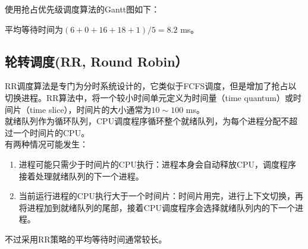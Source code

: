使用抢占优先级调度算法的Gantt图如下：

\begin{figure}[H]
    \centering
\end{figure}

平均等待时间为$ (6 + 0 + 16 + 18 + 1) / 5 = 8.2 $ ms。\\

\subsection{轮转调度(RR, Round Robin）}

RR调度算法是专门为分时系统设计的，它类似于FCFS调度，但是增加了抢占以切换进程。RR算法中，将一个较小时间单元定义为时间量（time quantum）或时间片（time slice），时间片的大小通常为$ 10 \sim 100 $ ms。\\

就绪队列作为循环队列，CPU调度程序循环整个就绪队列，为每个进程分配不超过一个时间片的CPU。\\

有两种情况可能发生：

\begin{enumerate}
    \item 进程可能只需少于时间片的CPU执行：进程本身会自动释放CPU，调度程序接着处理就绪队列的下一个进程。

    \item 当前运行进程的CPU执行大于一个时间片：时间片用完，进行上下文切换，再将进程加到就绪队列的尾部，接着CPU调度程序会选择就绪队列内的下一个进程。
\end{enumerate}

不过采用RR策略的平均等待时间通常较长。\\

